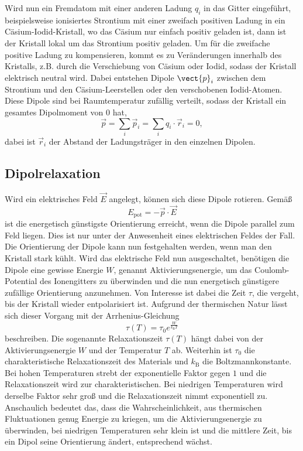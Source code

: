 Wird nun ein Fremdatom mit einer anderen Ladung $q_i$ in das Gitter eingeführt, beispielsweise ionisiertes Strontium mit einer zweifach positiven Ladung in ein Cäsium-Iodid-Kristall, wo das Cäsium nur einfach positiv geladen ist,
dann ist der Kristall lokal um das Strontium positiv geladen. Um für die zweifache positive Ladung zu kompensieren, kommt es zu Veränderungen innerhalb des Kristalls, z.B. durch die Verschiebung von Cäsium oder Iodid, sodass der Kristall
elektrisch neutral wird. Dabei entstehen Dipole $\vect{p}_i$ zwischen dem Strontium und den Cäsium-Leerstellen oder den verschobenen Iodid-Atomen. Diese Dipole sind bei Raumtemperatur zufällig verteilt, sodass der Kristall ein gesamtes Dipolmoment von 0 hat,
\begin{equation*}
    \vec{p} = \sum_i \vec{p}_i = \sum_i q_i \cdot \vec{r}_i = 0,
 \end{equation*}
 dabei ist $\vec{r}_i$ der Abstand der Ladungsträger in den einzelnen Dipolen.




\subsection{Dipolrelaxation}

Wird ein elektrisches Feld $\vec{E}$ angelegt, können sich diese Dipole rotieren. Gemäß
\begin{equation*}
    E_\text{pot} = - \vec{p} \cdot \vec{E}
\end{equation*}
ist die energetisch günstigste Orientierung erreicht, wenn die Dipole parallel zum Feld liegen. Dies ist nur unter der Anwesenheit eines elektrischen Feldes der Fall.
Die Orientierung der Dipole kann nun festgehalten werden, wenn man den Kristall stark kühlt. Wird das elektrische Feld nun ausgeschaltet, benötigen die Dipole eine gewisse Energie $W$, genannt Aktivierungsenergie, um das Coulomb-Potential des Ionengitters zu überwinden
und die nun energetisch günstigere zufällige Orientierung anzunehmen. 
Von Interesse ist dabei die Zeit $\tau$, die vergeht, bis der Kristall wieder entpolarisiert ist. Aufgrund der thermischen Natur lässt sich dieser Vorgang mit der Arrhenius-Gleichung 
\begin{equation}
    \tau\left(T\right) = \tau_0 e^{\frac{W}{k_\text{B}T}}
    \label{eq:arrhenius}
\end{equation}
beschreiben. Die sogenannte Relaxationszeit $\tau\left(T\right)$ hängt dabei von der Aktivierungsenergie $W$ und der Temperatur $T$ ab. Weiterhin ist $\tau_0$ die charakteristische Relaxationszeit des Materials und $k_\text{B}$
die Boltzmannkonstante. Bei hohen Temperaturen strebt der exponentielle Faktor gegen $1$ und die Relaxationszeit wird zur charakteristischen. Bei niedrigen Temperaturen wird derselbe Faktor sehr groß und die Relaxationszeit nimmt exponentiell zu.
Anschaulich bedeutet das, dass die Wahrscheinlichkeit, aus thermischen Fluktuationen genug Energie zu kriegen, um die Aktivierungsenergie zu überwinden, bei niedrigen Temperaturen sehr klein ist und die mittlere Zeit, bis ein Dipol seine Orientierung ändert, entsprechend wächst.

